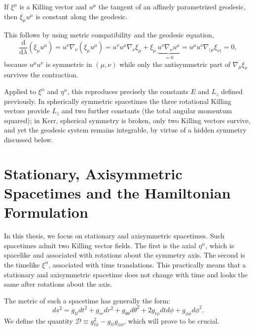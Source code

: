 \documentclass[11pt]{book}
\begin{document}
{If $\xi^\mu$ is a Killing vector and $u^\mu$ the tangent of an affinely
parametrized geodesic, then $\xi_\mu u^\mu$ is constant along the geodesic.}

This follows by using metric compatibility and the geodesic equation,
\begin{equation}
    \frac{\mathrm{d}}{\mathrm{d}\lambda}\left(\xi_\mu u^\mu\right)
    = u^\nu \nabla_\nu\left(\xi_\mu u^\mu\right)
    = u^\nu u^\mu \nabla_\nu \xi_\mu + \xi_\mu\, \underbrace{u^\nu\nabla_\nu u^\mu}_{=0}
    = u^\mu u^\nu \nabla_{(\mu}\xi_{\nu)} = 0 ,
\end{equation}
because $u^\mu u^\nu$ is symmetric in $(\mu,\nu)$ while only the antisymmetric part of
 $\nabla_\mu \xi_\nu$ survives the contraction.

Applied to $\xi^\alpha$ and $\eta^\alpha$, this reproduces precisely the constants $E$ and $L_z$ defined previously. In spherically symmetric spacetimes the three rotational
Killing vectors provide $L_z$ and two further constants (the total angular momentum
squared); in Kerr, spherical symmetry is broken, only two Killing vectors survive,
and yet the geodesic system remains integrable, by virtue of a hidden symmetry
discussed below.

\section{Stationary, Axisymmetric Spacetimes and the Hamiltonian Formulation}

In this thesis, we focus on stationary and axisymmetric spacetimes. Such spacetimes admit two Killing vector fields. The first is the axial $\eta^{\alpha}$, which is spacelike and associated with rotations about the symmetry axis. The second is the timelike $\xi^{\alpha}$, associated with time translations. This practically means that a stationary and axisymmetric spacetime does not change with time and looks the same after rotations about the axis.

The metric of such a spacetime has generally the form:
\begin{equation}
    ds^2 = g_{tt} dt^2 + g_{rr} dr^2 + g_{\theta\theta} d\theta^2 + 2g_{t\phi} dtd\phi + g_{\phi\phi} d\phi^2.
\end{equation}
We define the quantity $\mathcal{D} \equiv g_{t\phi}^2 - g_{tt} g_{\phi\phi}$, which will prove to be crucial.
\end{document}
